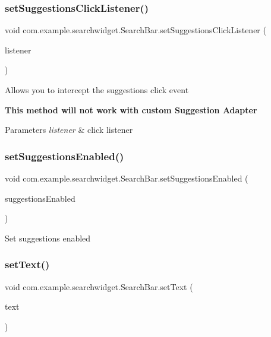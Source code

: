 \subsubsection{\texorpdfstring{setSuggestionsClickListener()}{setSuggestionsClickListener()}}
{\footnotesize\ttfamily void com.\+example.\+searchwidget.\+Search\+Bar.\+set\+Suggestions\+Click\+Listener (\begin{DoxyParamCaption}\item[{Suggestions\+Adapter.\+On\+Item\+View\+Click\+Listener}]{listener }\end{DoxyParamCaption})}

Allows you to intercept the suggestions click event 

{\bfseries{This method will not work with custom Suggestion Adapter}}


\begin{DoxyParams}{Parameters}
{\em listener} & click listener \\
\hline
\end{DoxyParams}
\mbox{\label{classcom_1_1example_1_1searchwidget_1_1_search_bar_af24e5b6d3487e7ac76d615e5260a0054}} 
\subsubsection{\texorpdfstring{setSuggestionsEnabled()}{setSuggestionsEnabled()}}
{\footnotesize\ttfamily void com.\+example.\+searchwidget.\+Search\+Bar.\+set\+Suggestions\+Enabled (\begin{DoxyParamCaption}\item[{boolean}]{suggestions\+Enabled }\end{DoxyParamCaption})}

Set suggestions enabled \mbox{\label{classcom_1_1example_1_1searchwidget_1_1_search_bar_a63dbff92b8fbbdb0fbe556055a99978d}} 
\subsubsection{\texorpdfstring{setText()}{setText()}}
{\footnotesize\ttfamily void com.\+example.\+searchwidget.\+Search\+Bar.\+set\+Text (\begin{DoxyParamCaption}\item[{String}]{text }\end{DoxyParamCaption})}

